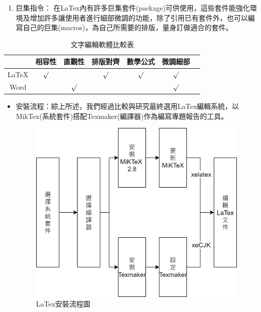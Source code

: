 \documentclass[14pt,a4paper]{report}  %
\begin{document}
{{{{{{\begin{enumerate}
    	\item 巨集指令：
在LaTex內有許多巨集套件(package)可供使用，這些套件能強化環境及增加許多讓使用者進行細部微調的功能，除了引用已有套件外，也可以編寫自己的巨集(macros)，為自己所需要的排版，量身訂做適合的套件。
		 \end{enumerate}
		 
		 \begin{table}[htbp] %
			\centering%
			\caption{文字編輯軟體比較表}%
			\large%
			\label{tab_文字編輯軟體比較表:scale}
			\begin{tabular}{|c|c|c|c|c|c|c|}
			\hline
			\diagbox[width=4em]& 相容性 & 直觀性 & 排版對齊 & 數學公式 & 微調細部\\ 
			\hline
			LaTeX 		&$\surd$&		&$\surd$&$\surd$&$\surd$\\
			\hline
			Word	 	&		&$\surd$&		&		&$\surd$\\
			\hline
			
			\end{tabular}
		\end{table}	
		
		 \begin{itemize}
		 \item 安裝流程：綜上所述，我們經過比較與研究最終選用LaTex編輯系統，以MikTex(系統套件)搭配Texmaker(編譯器)作為編寫專題報告的工具。
		 
        \begin{figure}[H]
        \centering
        \includegraphics[scale=0.2]{LaTex安裝流程圖.png} 
        \caption{LaTex安裝流程圖} 
		\label{fig_LaTex安裝流程圖:scale}
    	\end{figure}
		 

\end{itemize}}}}}}}
\end{document}
